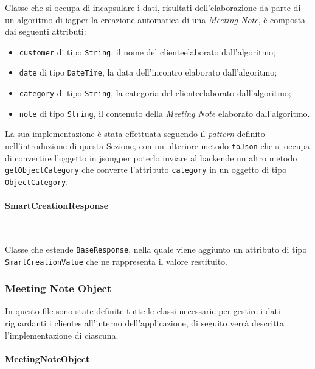 \noindent Classe che si occupa di incapsulare i dati, risultati dell'elaborazione da parte di un algoritmo di \gls{iag}\glsoccur per la creazione automatica di una \emph{Meeting Note}, è composta dai seguenti attributi:
\begin{itemize}
    \item \lstinline{customer} di tipo \lstinline{String}, il nome del \gls{cliente}\glsoccur elaborato dall'algoritmo;
    \item \lstinline{date} di tipo \lstinline{DateTime}, la data dell'incontro elaborato dall'algoritmo;
    \item \lstinline{category} di tipo \lstinline{String}, la categoria del \gls{cliente}\glsoccur elaborato dall'algoritmo;
    \item \lstinline{note} di tipo \lstinline{String}, il contenuto della \emph{Meeting Note} elaborato dall'algoritmo.
\end{itemize}
La sua implementazione è stata effettuata seguendo il \emph{pattern} definito nell'introduzione di questa Sezione, con un ulteriore metodo \lstinline{toJson} che si occupa di convertire l'oggetto in \gls{jsong}\glsoccur per poterlo inviare al \gls{backend}\glsoccur e un altro metodo \lstinline{getObjectCategory} che converte l'attributo \lstinline{category} in un oggetto di tipo \lstinline{ObjectCategory}.

\paragraph*{SmartCreationResponse} ~ \\
\label{par:smart-creation-response}

\noindent Classe che estende \lstinline{BaseResponse}, nella quale viene aggiunto un attributo di tipo \lstinline{SmartCreationValue} che ne rappresenta il valore restituito.

\subsubsection*{Meeting Note Object}
\label{subsubsec:meeting-note-object}

In questo file sono state definite tutte le classi necessarie per gestire i dati riguardanti i \glspl{cliente} all'interno dell'applicazione, di seguito verrà descritta l'implementazione di ciascuna.

\paragraph*{MeetingNoteObject} ~ \\
\label{par:meeting-note-object}


